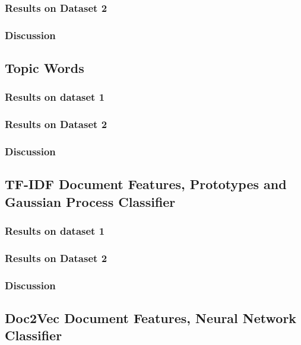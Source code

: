 \subsubsection{Results on Dataset 2}

\subsubsection{Discussion}



\subsection{Topic Words}

\subsubsection{Results on dataset 1}

\subsubsection{Results on Dataset 2}

\subsubsection{Discussion}



\subsection{TF-IDF Document Features, Prototypes and Gaussian Process Classifier}

\subsubsection{Results on dataset 1}

\subsubsection{Results on Dataset 2}

\subsubsection{Discussion}



\subsection{Doc2Vec Document Features, Neural Network Classifier}

